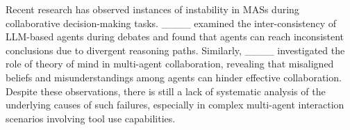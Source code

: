 Recent research has observed instances of instability in MASs during collaborative decision-making tasks. 
____ examined the inter-consistency of LLM-based agents during debates and found that agents can reach inconsistent conclusions due to divergent reasoning paths. 
Similarly, ____ investigated the role of theory of mind in multi-agent collaboration, revealing that misaligned beliefs and misunderstandings among agents can hinder effective collaboration. 
Despite these observations, there is still a lack of systematic analysis of the underlying causes of such failures, especially in complex multi-agent interaction scenarios involving tool use capabilities.